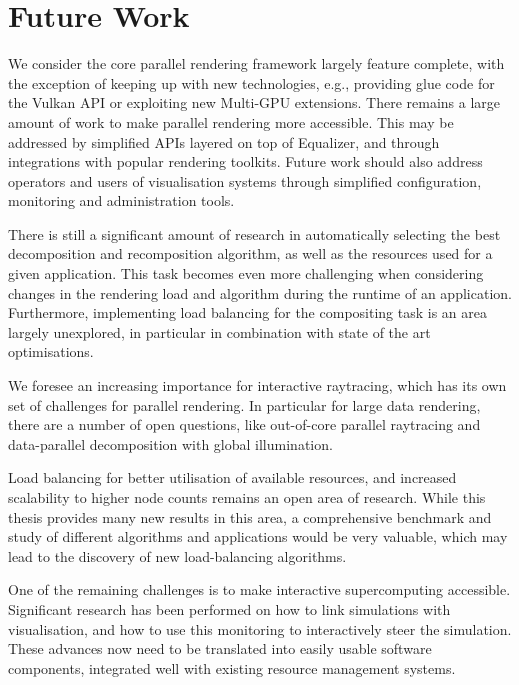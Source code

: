 \section{Future Work}

We consider the core parallel rendering framework largely feature complete,
with the exception of keeping up with new technologies, e.g., providing glue
code for the Vulkan API or exploiting new Multi-GPU extensions. There remains a
large amount of work to make parallel rendering more accessible. This may be
addressed by simplified APIs layered on top of Equalizer, and through
integrations with popular rendering toolkits. Future work should also address
operators and users of visualisation systems through simplified configuration,
monitoring and administration tools.

There is still a significant amount of research in automatically selecting the
best decomposition and recomposition algorithm, as well as the resources used
for a given application. This task becomes even more challenging when
considering changes in the rendering load and algorithm during the runtime of
an application. Furthermore, implementing load balancing for the compositing
task is an area largely unexplored, in particular in combination with state of
the art optimisations.

We foresee an increasing importance for interactive raytracing, which has its
own set of challenges for parallel rendering. In particular for large data
rendering, there are a number of open questions, like out-of-core parallel
raytracing and data-parallel decomposition with global illumination.

Load balancing for better utilisation of available resources, and increased
scalability to higher node counts remains an open area of research. While this
thesis provides many new results in this area, a comprehensive benchmark and
study of different algorithms and applications would be very valuable,
which may lead to the discovery of new load-balancing algorithms.

One of the remaining challenges is to make interactive supercomputing
accessible. Significant research has been performed on how to link simulations
with visualisation, and how to use this monitoring to interactively steer the
simulation. These advances now need to be translated into easily usable
software components, integrated well with existing resource management systems.
